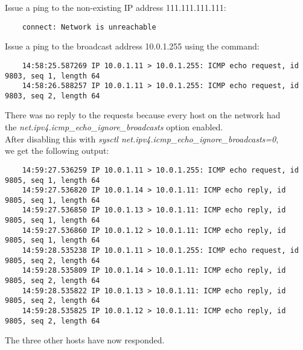 Issue a ping to the non-existing IP address 111.111.111.111:\\
   \begin{lstlisting}  
    connect: Network is unreachable
\end{lstlisting}  
Issue a ping to the broadcast address 10.0.1.255 using the command:
\begin{lstlisting}  
    14:58:25.587269 IP 10.0.1.11 > 10.0.1.255: ICMP echo request, id 9803, seq 1, length 64
    14:58:26.588257 IP 10.0.1.11 > 10.0.1.255: ICMP echo request, id 9803, seq 2, length 64
\end{lstlisting}  
    There was no reply to the requests because every host on the network had \\the \textit{net.ipv4.icmp\_echo\_ignore\_broadcasts} option enabled.\\
After disabling this with \textit{sysctl net.ipv4.icmp\_echo\_ignore\_broadcasts=0},\\ we get the following output:
\begin{lstlisting}	  
	14:59:27.536259 IP 10.0.1.11 > 10.0.1.255: ICMP echo request, id 9805, seq 1, length 64
	14:59:27.536820 IP 10.0.1.14 > 10.0.1.11: ICMP echo reply, id 9805, seq 1, length 64
	14:59:27.536850 IP 10.0.1.13 > 10.0.1.11: ICMP echo reply, id 9805, seq 1, length 64
	14:59:27.536860 IP 10.0.1.12 > 10.0.1.11: ICMP echo reply, id 9805, seq 1, length 64
	14:59:28.535238 IP 10.0.1.11 > 10.0.1.255: ICMP echo request, id 9805, seq 2, length 64
	14:59:28.535809 IP 10.0.1.14 > 10.0.1.11: ICMP echo reply, id 9805, seq 2, length 64
	14:59:28.535822 IP 10.0.1.13 > 10.0.1.11: ICMP echo reply, id 9805, seq 2, length 64
	14:59:28.535825 IP 10.0.1.12 > 10.0.1.11: ICMP echo reply, id 9805, seq 2, length 64
\end{lstlisting}

The three other hosts have now responded.

